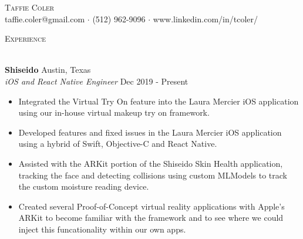 \documentclass[a4paper]{article}
\newcommand{\lineunder} {
    \vspace*{-8pt} \\
    \hspace*{-18pt} \hrulefill \\
}
\newcommand{\header} [1] {
    {\hspace*{-18pt}\vspace*{6pt} \textsc{#1}}
    \vspace*{-6pt} \lineunder
}
\begin{document}
\vspace*{-40pt}

    

\vspace*{-10pt}
\begin{center}
	{\Huge \scshape {Taffie Coler}}\\
	taffie.coler@gmail.com $\cdot$ (512) 962-9096 $\cdot$ www.linkedin.com/in/tcoler/\\
\end{center}

\header{Experience}
\vspace{1mm}

\textbf{Shiseido} \hfill Austin, Texas\\
\textit{iOS and React Native Engineer} \hfill Dec 2019 - Present\\
\vspace{-1mm}
\begin{itemize} \itemsep 1pt
    \item Integrated the Virtual Try On feature into the Laura Mercier iOS application using our in-house virtual makeup try on framework.
    \item Developed features and fixed issues in the Laura Mercier iOS application using a hybrid of Swift, Objective-C and React Native.
    \item Assisted with the ARKit portion of the Shiseido Skin Health application, tracking the face and detecting collisions using custom MLModels to track the custom moisture reading device.
    \item Created several Proof-of-Concept virtual reality applications with Apple's ARKit to become familiar with the framework and to see where we could inject this funcationality within our own apps.
\end{itemize}
\vspace{2mm}
\end{document}
